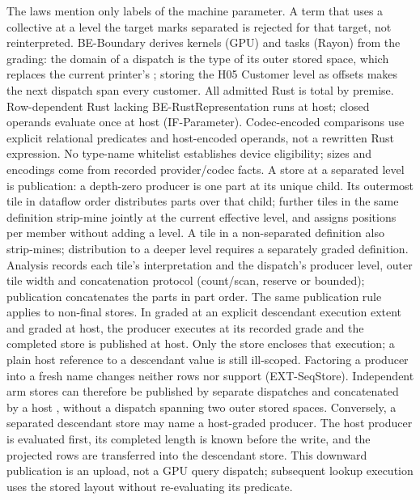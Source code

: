 The laws mention only labels of the machine parameter. A term that uses a
collective at a level the target marks separated is rejected for that
target, not reinterpreted. BE-Boundary derives kernels (GPU) and tasks
(Rayon) from the grading: the domain of a dispatch is the type of its outer
stored space, which replaces the current printer's
; storing the H05 Customer level as
offsets makes the next dispatch span every customer. All admitted Rust is
total by premise. Row-dependent Rust lacking BE-RustRepresentation runs at
host; closed operands evaluate once at host (IF-Parameter). Codec-encoded
comparisons use explicit relational predicates and host-encoded operands,
not a rewritten Rust expression. No type-name whitelist establishes device
eligibility; sizes and encodings come from recorded provider/codec facts.
A store at a separated level is publication: a depth-zero producer is one
part at its unique child. Its outermost tile in dataflow order distributes parts over that
child; further tiles in the same definition strip-mine jointly at the
current effective level, and  assigns positions per member
without adding a level. A tile in a non-separated definition also
strip-mines; distribution to a deeper level requires a separately graded
definition. Analysis records each tile's interpretation and the dispatch's
producer level, outer tile width and concatenation protocol (count/scan,
reserve or bounded); publication concatenates the parts in part order.
The same publication rule applies to non-final stores. In
 graded at an explicit descendant execution extent and
 graded at host, the producer executes at its recorded
grade and the completed store is published at host. Only the store encloses
that execution; a plain host reference to a descendant value is still
ill-scoped. Factoring a producer into a fresh name changes neither rows nor
support (EXT-SeqStore). Independent arm stores can therefore be published
by separate dispatches and concatenated by a host , without a
dispatch spanning two outer stored spaces.
Conversely, a separated descendant store may name a host-graded producer.
The host producer is evaluated first, its completed length is known before
the write, and the projected rows are transferred into the descendant store.
This downward publication is an upload, not a GPU query dispatch; subsequent
lookup execution uses the stored layout without re-evaluating its predicate.

